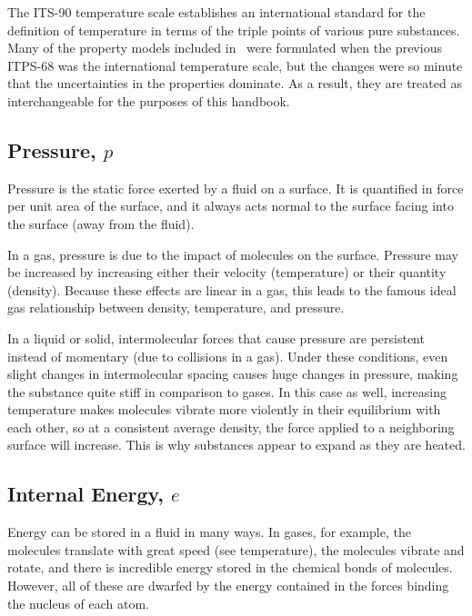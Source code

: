The ITS-90 temperature scale establishes an international standard for the definition of temperature in terms of the triple points of various pure substances.  Many of the property models included in \PM\ were formulated when the previous ITPS-68 was the international temperature scale, but the changes were so minute that the uncertainties in the properties dominate\cite[p.10]{janaf:1:1998}.  As a result, they are treated as interchangeable for the purposes of this handbook.

\subsection{Pressure, $p$}\label{sec:intro:p}

Pressure is the static force exerted by a fluid on a surface.  It is quantified in force per unit area of the surface, and it always acts normal to the surface facing into the surface (away from the fluid).  

In a gas, pressure is due to the impact of molecules on the surface.  Pressure may be increased by increasing either their velocity (temperature) or their quantity (density).  Because these effects are linear in a gas, this leads to the famous ideal gas relationship between density, temperature, and pressure.  

In a liquid or solid, intermolecular forces that cause pressure are persistent instead of momentary (due to collisions in a gas).  Under these conditions, even slight changes in intermolecular spacing causes huge changes in pressure, making the substance quite stiff in comparison to gases.  In this case as well, increasing temperature makes molecules vibrate more violently in their equilibrium with each other, so at a consistent average density, the force applied to a neighboring surface will increase.  This is why substances appear to expand as they are heated.

\subsection{Internal Energy, $e$}\label{sec:intro:e}

Energy can be stored in a fluid in many ways.  In gases, for example, the molecules translate with great speed (see temperature), the molecules vibrate and rotate, and there is incredible energy stored in the chemical bonds of molecules.  However, all of these are dwarfed by the energy contained in the forces binding the nucleus of each atom.


